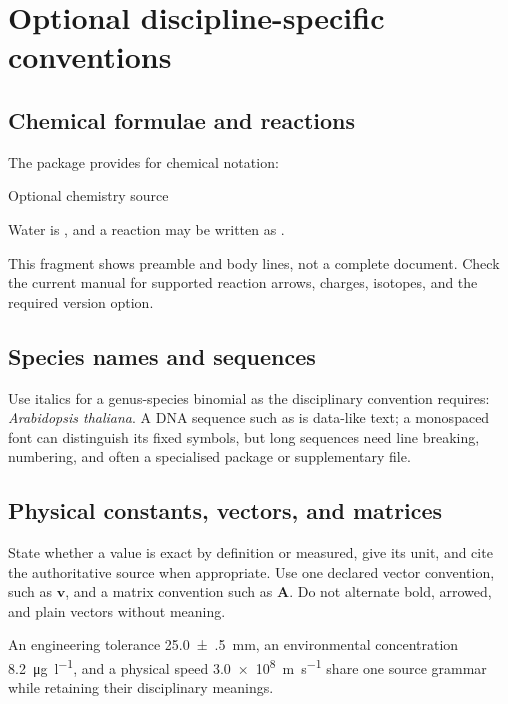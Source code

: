 \section{Optional discipline-specific conventions}

\subsection{Chemical formulae and reactions}

The  package provides  for chemical notation:

\begin{latexcode}{Optional chemistry source}
\usepackage[version=4]{mhchem}

Water is , and a reaction may be written as
.
\end{latexcode}

This fragment shows preamble and body lines, not a complete document. Check the
current  manual for supported reaction arrows, charges, isotopes,
and the required version option.

\subsection{Species names and sequences}

Use italics for a genus-species binomial as the disciplinary convention
requires: \textit{Arabidopsis thaliana}. A DNA sequence such as
 is data-like text; a monospaced font can distinguish its fixed
symbols, but long sequences need line breaking, numbering, and often a
specialised package or supplementary file.

\subsection{Physical constants, vectors, and matrices}

State whether a value is exact by definition or measured, give its unit, and
cite the authoritative source when appropriate. Use one declared vector
convention, such as \(\mathbf{v}\), and a matrix convention such as
\(\mathbf{A}\). Do not alternate bold, arrowed, and plain vectors without
meaning.

\begin{scienceinpractice}
An engineering tolerance \qty{25.0(5)}{\milli\metre}, an environmental
concentration \qty{8.2}{\micro\gram\per\litre}, and a physical speed
\qty{3.0e8}{\metre\per\second} share one source grammar while retaining their
disciplinary meanings.
\end{scienceinpractice}

